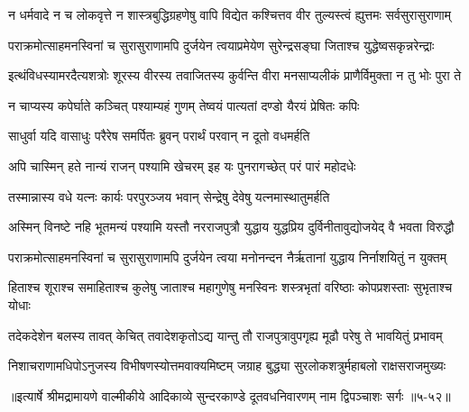 \twolineshloka
{न धर्मवादे न च लोकवृत्ते न शास्त्रबुद्धिग्रहणेषु वापि}
{विद्येत कश्चित्तव वीर तुल्यस्त्वं ह्युत्तमः सर्वसुरासुराणाम्} %

\twolineshloka
{पराक्रमोत्साहमनस्विनां च सुरासुराणामपि दुर्जयेन}
{त्वयाप्रमेयेण सुरेन्द्रसङ्घा जिताश्च युद्धेष्वसकृन्नरेन्द्राः} %

\twolineshloka
{इत्थंविधस्यामरदैत्यशत्रोः शूरस्य वीरस्य तवाजितस्य}
{कुर्वन्ति वीरा मनसाप्यलीकं प्राणैर्विमुक्ता न तु भोः पुरा ते} %

\twolineshloka
{न चाप्यस्य कपेर्घाते कञ्चित् पश्याम्यहं गुणम्}
{तेष्वयं पात्यतां दण्डो यैरयं प्रेषितः कपिः} %

\twolineshloka
{साधुर्वा यदि वासाधुः परैरेष समर्पितः}
{ब्रुवन् परार्थं परवान् न दूतो वधमर्हति} %

\twolineshloka
{अपि चास्मिन् हते नान्यं राजन् पश्यामि खेचरम्}
{इह यः पुनरागच्छेत् परं पारं महोदधेः} %

\twolineshloka
{तस्मान्नास्य वधे यत्नः कार्यः परपुरञ्जय}
{भवान् सेन्द्रेषु देवेषु यत्नमास्थातुमर्हति} %

\twolineshloka
{अस्मिन् विनष्टे नहि भूतमन्यं पश्यामि यस्तौ नरराजपुत्रौ}
{युद्धाय युद्धप्रिय दुर्विनीतावुद्योजयेद् वै भवता विरुद्धौ} %

\twolineshloka
{पराक्रमोत्साहमनस्विनां च सुरासुराणामपि दुर्जयेन}
{त्वया मनोनन्दन नैर्ऋतानां युद्धाय निर्नाशयितुं न युक्तम्} %

\twolineshloka
{हिताश्च शूराश्च समाहिताश्च कुलेषु जाताश्च महागुणेषु}
{मनस्विनः शस्त्रभृतां वरिष्ठाः कोपप्रशस्ताः सुभृताश्च योधाः} %

\twolineshloka
{तदेकदेशेन बलस्य तावत् केचित् तवादेशकृतोऽद्य यान्तु}
{तौ राजपुत्रावुपगृह्य मूढौ परेषु ते भावयितुं प्रभावम्} %

\twolineshloka
{निशाचराणामधिपोऽनुजस्य विभीषणस्योत्तमवाक्यमिष्टम्}
{जग्राह बुद्ध्या सुरलोकशत्रुर्महाबलो राक्षसराजमुख्यः} %


॥इत्यार्षे श्रीमद्रामायणे वाल्मीकीये आदिकाव्ये सुन्दरकाण्डे दूतवधनिवारणम् नाम द्विपञ्चाशः सर्गः ॥५-५२॥
